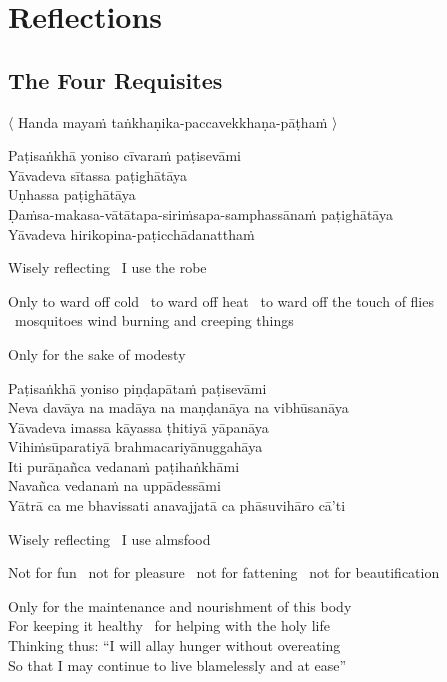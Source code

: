 
\chapter{Reflections}

\section{The Four Requisites}
\label{four-requisites}

\begin{leader}
  〈 Handa mayaṁ taṅkhaṇika-paccavekkhaṇa-pāṭhaṁ 〉
\end{leader}

Paṭisaṅkhā yoniso cīvaraṁ paṭisevāmi\\
Yāvadeva sītassa paṭighātāya\\
Uṇhassa paṭighātāya\\
Ḍaṁsa-makasa-vātātapa-siriṁsapa-samphassānaṁ paṭighātāya\\
Yāvadeva hirikopina-paṭicchādanatthaṁ

\begin{english-keepwith}
  Wisely reflecting \breathmark\ I use the robe
\begin{english-hangtogether}
  Only to ward off cold \breathmark\ to ward off heat \breathmark\ to ward off the touch of flies \breathmark\ mosquitoes wind burning and creeping things
\end{english-hangtogether}
  Only for the sake of modesty
\end{english-keepwith}

Paṭisaṅkhā yoniso piṇḍapātaṁ paṭisevāmi\\
Neva davāya na madāya na maṇḍanāya na vibhūsanāya\\
Yāvadeva imassa kāyassa ṭhitiyā yāpanāya\\
Vihiṁsūparatiyā brahmacariyānuggahāya\\
Iti purāṇañca vedanaṁ paṭihaṅkhāmi\\
Navañca vedanaṁ na uppādessāmi\\
Yātrā ca me bhavissati anavajjatā ca phāsuvihāro cā'ti

\begin{english-keepwith}
  Wisely reflecting \breathmark\ I use almsfood
\begin{english-hangtogether}
  Not for fun \breathmark\ not for pleasure \breathmark\ not for fattening \breathmark\ not for beautification
\end{english-hangtogether}
  Only for the maintenance and nourishment of this body\\
  For keeping it healthy \breathmark\ for helping with the holy life\\
  Thinking thus: ``I will allay hunger without overeating\\
  So that I may continue to live blamelessly and at ease''
\end{english-keepwith}

